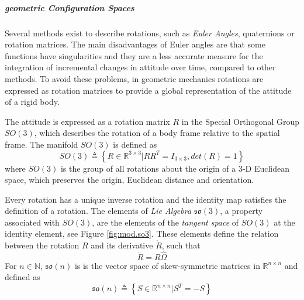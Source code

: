 \subparagraph{geometric Configuration Spaces}
Several methods exist to describe rotations, such as \textit{Euler Angles}, quaternions or rotation matrices. 
The main disadvantages of Euler angles are that some functions have singularities and they are a less accurate measure for the integration of incremental changes in attitude over time, compared to other methods. 
To avoid these problems, in geometric mechanics rotations are expressed as rotation matrices to provide a global representation of the attitude of a rigid body. 
 
The  attitude is expressed as a rotation matrix $ R $ in the Special Orthogonal Group $ SO(3) $, which describes the rotation of a body frame relative to the spatial frame. The manifold $ SO(3) $ is defined as
\begin{equation}\label{eq:SO3}
SO(3) \triangleq \left\lbrace R\in\mathbb{R}^{3\times3}|RR^T=I_{3\times3}, det(R)=1\right\rbrace 
\end{equation}
where $ SO(3) $ is the group of all rotations about the origin of a 3-D Euclidean space, which preserves the origin, Euclidean distance and orientation. \cite{Chaturvedi2011,Murray1994}

Every rotation has a unique inverse rotation and the identity map satisfies the definition of a rotation. The elements of \textit{Lie Algebra} $ \mathfrak{so}(3) $, a property associated with $ SO(3) $, are the elements of the \textit{tangent space} of $ SO(3) $ at the identity element, see Figure \ref{fig:mod.so3}. 
These elements define the relation between the rotation $ R $ and its derivative $ \dot{R} $, such that
\begin{equation}\label{eq:Rdot}
\dot{R} = R\hat{\Omega}
\end{equation}
For $ n\in \mathbb{N} $, $ \mathfrak{so}(n) $ is is the vector space of skew-symmetric matrices in $ \mathbb{R}^{n\times n} $ and defined as
\begin{equation}\label{eq:so3}
\mathfrak{so}(n) \triangleq \left\lbrace S\in \mathbb{R}^{n\times n}|S^T=-S\right\rbrace
\end{equation}

